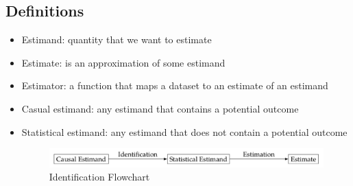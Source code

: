 \documentclass[../main.tex]{subfiles}
\begin{document}
  \subsection{Definitions}
    \begin{itemize}
      \item Estimand: quantity that we want to estimate
      \item Estimate: is an approximation of some estimand
      \item Estimator: a function that maps a dataset to an estimate of an estimand
      \item Casual estimand: any estimand that contains a potential outcome
      \item Statistical estimand: any estimand that does not contain a potential outcome
      \begin{figure}[h]
        \caption{Identification Flowchart}
        \centering
        \includegraphics[width=1\textwidth]{../imgs/identification.png}
      \end{figure}


\end{itemize}
\end{document}
